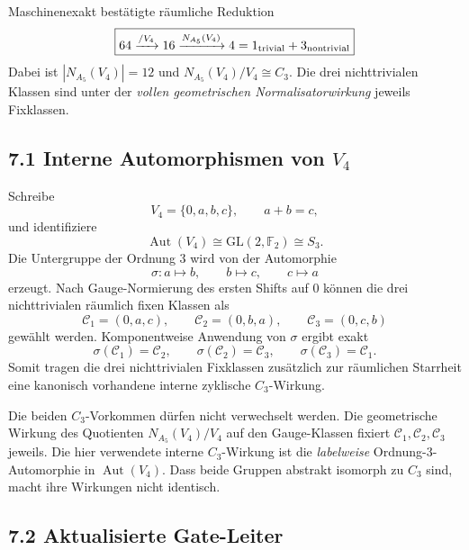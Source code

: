 \documentclass[11pt,a4paper]{article}
\begin{document}
\begin{statusbox}{Maschinenexakt bestätigte räumliche Reduktion}
\[
\boxed{
64
\xrightarrow{/V_4}
16
\xrightarrow{N_{A_5}(V_4)}
4=1_{\rm trivial}+3_{\rm nontrivial}}
\]
Dabei ist $|N_{A_5}(V_4)|=12$ und $N_{A_5}(V_4)/V_4\cong C_3$. Die drei nichttrivialen Klassen sind unter der \emph{vollen geometrischen Normalisatorwirkung} jeweils Fixklassen.
\end{statusbox}

\subsection*{7.1 Interne Automorphismen von $V_4$}

Schreibe
\[
V_4=\{0,a,b,c\},\qquad a+b=c,
\]
und identifiziere
\[
\operatorname{Aut}(V_4)\cong \mathrm{GL}(2,\mathbb F_2)\cong S_3.
\]
Die Untergruppe der Ordnung $3$ wird von der Automorphie
\[
\sigma:a\mapsto b,\qquad b\mapsto c,\qquad c\mapsto a
\]
erzeugt. Nach Gauge-Normierung des ersten Shifts auf $0$ können die drei nichttrivialen räumlich fixen Klassen als
\[
\mathcal C_1=(0,a,c),\qquad
\mathcal C_2=(0,b,a),\qquad
\mathcal C_3=(0,c,b)
\]
gewählt werden. Komponentweise Anwendung von $\sigma$ ergibt exakt
\[
\boxed{
\sigma(\mathcal C_1)=\mathcal C_2,\qquad
\sigma(\mathcal C_2)=\mathcal C_3,\qquad
\sigma(\mathcal C_3)=\mathcal C_1.}
\]
Somit tragen die drei nichttrivialen Fixklassen zusätzlich zur räumlichen Starrheit eine kanonisch vorhandene interne zyklische $C_3$-Wirkung.

\begin{warningbox}
Die beiden $C_3$-Vorkommen dürfen nicht verwechselt werden. Die geometrische Wirkung des Quotienten $N_{A_5}(V_4)/V_4$ auf den Gauge-Klassen fixiert $\mathcal C_1,\mathcal C_2,\mathcal C_3$ jeweils. Die hier verwendete interne $C_3$-Wirkung ist die \emph{labelweise} Ordnung-$3$-Automorphie in $\operatorname{Aut}(V_4)$. Dass beide Gruppen abstrakt isomorph zu $C_3$ sind, macht ihre Wirkungen nicht identisch.
\end{warningbox}

\subsection*{7.2 Aktualisierte Gate-Leiter}
\end{document}
